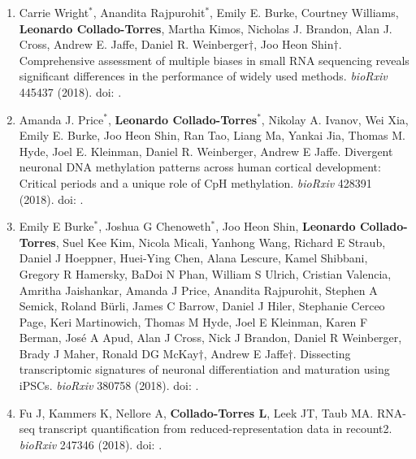 \begin{enumerate}
        \item Carrie Wright$^{*}$, Anandita Rajpurohit$^{*}$, Emily E. Burke, Courtney Williams, \textbf{Leonardo Collado-Torres}, Martha Kimos, Nicholas J. Brandon, Alan J. Cross, Andrew E. Jaffe, Daniel R. Weinberger$\dagger$, Joo Heon Shin$\dagger$. Comprehensive assessment of multiple biases in small RNA sequencing reveals significant differences in the performance of widely used methods. \emph{bioRxiv} 445437 (2018). doi: .
        
        \item Amanda J. Price$^{*}$, \textbf{Leonardo Collado-Torres}$^{*}$, Nikolay A. Ivanov, Wei Xia, Emily E. Burke, Joo Heon Shin, Ran Tao, Liang Ma, Yankai Jia, Thomas M. Hyde, Joel E. Kleinman, Daniel R. Weinberger, Andrew E Jaffe. Divergent neuronal DNA methylation patterns across human cortical development: Critical periods and a unique role of CpH methylation. \emph{bioRxiv} 428391 (2018). doi: .
        
        \item Emily E Burke$^{*}$, Joshua G Chenoweth$^{*}$, Joo Heon Shin, \textbf{Leonardo Collado-Torres}, Suel Kee Kim, Nicola Micali, Yanhong Wang, Richard E Straub, Daniel J Hoeppner, Huei-Ying Chen, Alana Lescure, Kamel Shibbani, Gregory R Hamersky, BaDoi N Phan, William S Ulrich, Cristian Valencia, Amritha Jaishankar, Amanda J Price, Anandita Rajpurohit, Stephen A Semick, Roland Bürli, James C Barrow, Daniel J Hiler, Stephanie Cerceo Page, Keri Martinowich, Thomas M Hyde, Joel E Kleinman, Karen F Berman, José A Apud, Alan J Cross, Nick J Brandon, Daniel R Weinberger, Brady J Maher, Ronald DG McKay$\dagger$, Andrew E Jaffe$\dagger$. Dissecting transcriptomic signatures of neuronal differentiation and maturation using iPSCs. \emph{bioRxiv} 380758 (2018). doi: .
        
        \item Fu J, Kammers K, Nellore A, \textbf{Collado-Torres L}, Leek JT, Taub MA. RNA-seq transcript quantification from reduced-representation data in recount2. \emph{bioRxiv} 247346 (2018). doi: .
    \end{enumerate}


